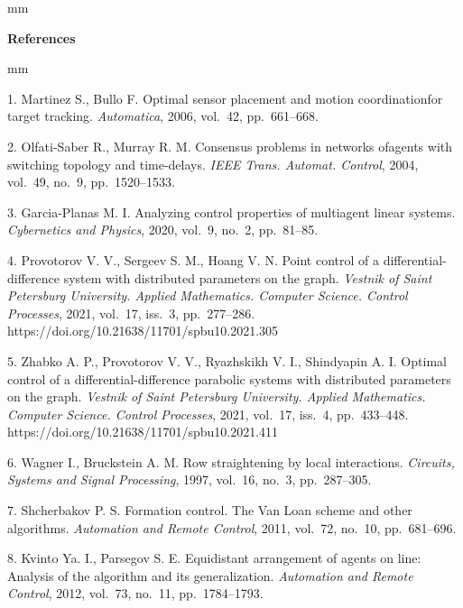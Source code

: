 

{\small



 mm

\noindent \textbf{References} }

 mm

{\footnotesize



1. Martinez S.,  Bullo F.
  Optimal sensor placement and motion coordinationfor target tracking.
  {\it Automatica}, 2006, vol.~42, pp.~661--668.

2. Olfati-Saber R.,  Murray R. M.
  Consensus problems in networks ofagents with switching topology
and time-delays.
  {\it IEEE Trans. Automat. Control},  2004,
vol.~49, no.~9,  pp.~1520--1533.


3. Garcia-Planas M. I.
  Analyzing control properties of multiagent linear systems.
   {\it  Cybernetics and Physics}, 2020, vol.~9, no.~2, pp.~81--85.



4. {Provotorov V. V., Sergeev S. M., Hoang V. N.}
Point control of a differential-difference system with distributed parameters on the graph.
{\it Vestnik of Saint Petersburg University.
Applied Mathematics. Computer Science. Control Processes},
 2021, vol.~17, iss.~3, pp.~277--286. \\
https://doi.org/10.21638/11701/spbu10.2021.305




5. {Zhabko A. P., Provotorov V. V.,  Ryazhskikh V. I.,  Shindyapin A. I.}
Optimal control of a differential-difference parabolic systems with distributed parameters
on the graph.
{\it Vestnik of Saint Petersburg University.
Applied Mathematics. Computer Science. Control Processes},
 2021, vol.~17, iss.~4, pp.~433--448. 
https://doi.org/10.21638/11701/spbu10.2021.411






6. Wagner I.,    Bruckstein A. M.
   Row straightening by local interactions.
  {\it Circuits, Systems and Signal Processing}, 1997, vol.~16, no.~3,
pp.~287--305.



7. Shcherbakov  P. S.
   Formation control. The Van Loan scheme and other algorithms.
  {\it Automation and Remote Control}, 2011, vol.~72, no.~10, pp.~681--696.


8. Kvinto Ya. I.,   Parsegov S. E.
    Equidistant arrangement of agents on line:
Analysis of the algorithm and its generalization.
   {\it Automation and Remote Control}, 2012, vol.~73, no.~11, pp.~1784--1793.






}
